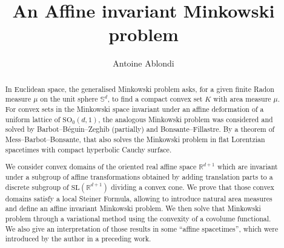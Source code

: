 \documentclass[reqno, a4paper]{amsart}
\title{An Affine invariant Minkowski problem}
\author{Antoine Ablondi}
\date{}
\numberwithin{equation}{section}
\numberwithin{figure}{section}
\theoremstyle{definition}
\theoremstyle{remark}
\newcommand{\R}{\mathbb{R}} %
\newcommand{\Sph}{\mathbb{S}} %
\newcommand{\SL}{\mathrm{SL}} %
\newcommand{\SO}{\mathrm{SO}} %
\begin{document}
 


\begin{abstract}

In Euclidean space, the generalised Minkowski problem asks, for a given finite Radon measure $\mu$ on the unit sphere $\Sph^d$, to find a compact convex set $K$ with area measure $\mu$. For convex sets in the Minkowski space invariant under an affine deformation of a uniform lattice of $\SO_0(d,1)$, the analogous Minkowski problem was considered and solved by Barbot--Béguin--Zeghib (partially) and Bonsante--Fillastre.
By a theorem of Mess--Barbot--Bonsante, that also solves the Minkowski problem in flat Lorentzian spacetimes with compact hyperbolic Cauchy surface. 

We consider convex domains of  the oriented real affine space $\R^{d+1}$ which are invariant under a subgroup of affine transformations obtained by adding translation parts to a discrete subgroup of $\SL (\R^{d+1})$ dividing a convex cone. 
We prove that those convex domains satisfy a local Steiner Formula, allowing to introduce natural area measures and define an affine invariant Minkowski problem. We then solve that Minkowski problem through a variational method using the convexity of a covolume functional.
We also give  an interpretation of those results in some ``affine spacetimes'', which were introduced by the author in a preceding work.

\end{abstract}
\maketitle


{\hypersetup{linkcolor=black}
\hypersetup{bookmarksdepth=2} \setcounter{tocdepth}{1} \tableofcontents}
\end{document}
